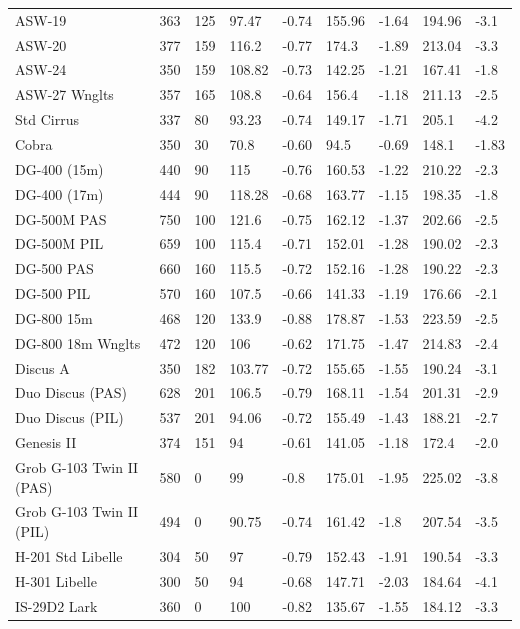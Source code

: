 \documentclass[a4paper,12pt]{refrep}
\begin{document}
\begin{maxipage}
\begin{small}
\begin{longtable}{l l l l l l l l l}
ASW-19 & 363 & 125 & 97.47 & -0.74 & 155.96 & -1.64 & 194.96 & -3.1 \\
ASW-20 & 377 & 159 & 116.2 & -0.77 & 174.3 & -1.89 & 213.04 & -3.3 \\
ASW-24 & 350 & 159 & 108.82 & -0.73 & 142.25 & -1.21 & 167.41 & -1.8 \\
ASW-27 Wnglts & 357 & 165 & 108.8 & -0.64 & 156.4 & -1.18 & 211.13 & -2.5 \\
Std Cirrus & 337 & 80 & 93.23 & -0.74 & 149.17 & -1.71 & 205.1 & -4.2 \\
Cobra & 350 & 30 & 70.8 & -0.60 & 94.5 & -0.69 & 148.1 & -1.83 \\
DG-400 (15m) & 440 & 90 & 115 & -0.76 & 160.53 & -1.22 & 210.22 & -2.3 \\
DG-400 (17m) & 444 & 90 & 118.28 & -0.68 & 163.77 & -1.15 & 198.35 & -1.8 \\
DG-500M PAS & 750 & 100 & 121.6 & -0.75 & 162.12 & -1.37 & 202.66 & -2.5 \\
DG-500M PIL & 659 & 100 & 115.4 & -0.71 & 152.01 & -1.28 & 190.02 & -2.3 \\
DG-500 PAS & 660 & 160 & 115.5 & -0.72 & 152.16 & -1.28 & 190.22 & -2.3 \\
DG-500 PIL & 570 & 160 & 107.5 & -0.66 & 141.33 & -1.19 & 176.66 & -2.1 \\
DG-800 15m & 468 & 120 & 133.9 & -0.88 & 178.87 & -1.53 & 223.59 & -2.5 \\
DG-800 18m Wnglts & 472 & 120 & 106 & -0.62 & 171.75 & -1.47 & 214.83 & -2.4 \\
Discus A & 350 & 182 & 103.77 & -0.72 & 155.65 & -1.55 & 190.24 & -3.1 \\
Duo Discus (PAS) & 628 & 201 & 106.5 & -0.79 & 168.11 & -1.54 & 201.31 & -2.9 \\
Duo Discus (PIL) & 537 & 201 & 94.06 & -0.72 & 155.49 & -1.43 & 188.21 & -2.7 \\
Genesis II & 374 & 151 & 94 & -0.61 & 141.05 & -1.18 & 172.4 & -2.0 \\
Grob G-103 Twin II (PAS) & 580 & 0 & 99 & -0.8 & 175.01 & -1.95 & 225.02 & -3.8 \\
Grob G-103 Twin II (PIL) & 494 & 0 & 90.75 & -0.74 & 161.42 & -1.8 & 207.54 & -3.5 \\
H-201 Std Libelle & 304 & 50 & 97 & -0.79 & 152.43 & -1.91 & 190.54 & -3.3 \\
H-301 Libelle & 300 & 50 & 94 & -0.68 & 147.71 & -2.03 & 184.64 & -4.1 \\
IS-29D2 Lark & 360 & 0 & 100 & -0.82 & 135.67 & -1.55 & 184.12 & -3.3 \\

\end{longtable}
\end{small}
\end{maxipage}
\end{document}
